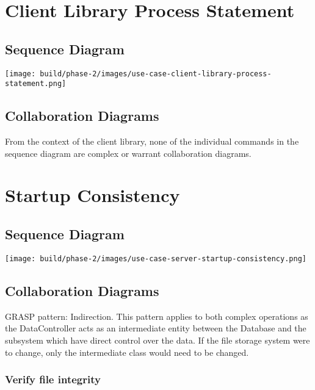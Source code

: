 \documentclass[a4paper]{report}
\begin{document}
\section{Client Library Process Statement}

	\subsection{Sequence Diagram}

		\begin{center}
			\texttt{[image: build/phase-2/images/use-case-client-library-process-statement.png]}
		\end{center}

	\subsection{Collaboration Diagrams}

		From the context of the client library, none of the individual commands in the sequence diagram are complex or warrant collaboration diagrams.

\section{Startup Consistency}

	\subsection{Sequence Diagram}

		\begin{center}
			\texttt{[image: build/phase-2/images/use-case-server-startup-consistency.png]}
		\end{center}

		\pagebreak

	\subsection{Collaboration Diagrams}

		GRASP pattern: Indirection. This pattern applies to both complex operations as the DataController acts as an intermediate entity between the Database and the subsystem which have direct control over the data. If the file storage system were to change, only the intermediate class would need to be changed.

		\subsubsection{Verify file integrity}
\end{document}
